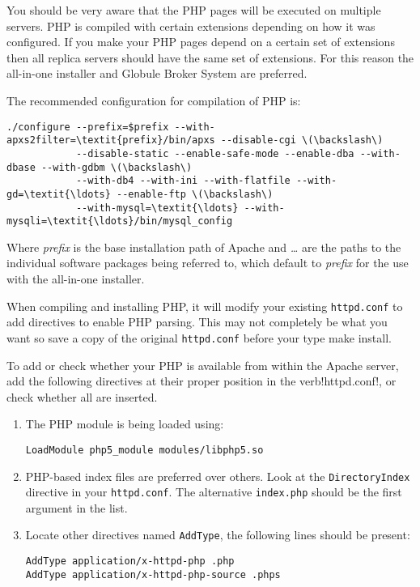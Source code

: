 \documentclass[10pt,a4paper]{article}
\makeatletter
\newenvironment{p}{\@open{P}{}}{\@close{P}}
\newenvironment{p}{}{\par}
\makeatother
\begin{document}
\begin{p}
You should be very aware that the PHP pages will be executed on multiple
servers.
PHP is compiled with certain extensions depending on how it was configured.
If you make your PHP pages depend on a certain set of extensions then all
replica servers should have the same set of extensions.  For this reason the
all-in-one installer and Globule Broker System are preferred.
\end{p}

\begin{p}
The recommended configuration for compilation of PHP is:
\end{p}
\begin{Verbatim}
./configure --prefix=$prefix --with-apxs2filter=\textit{prefix}/bin/apxs --disable-cgi \(\backslash\)
            --disable-static --enable-safe-mode --enable-dba --with-dbase --with-gdbm \(\backslash\)
            --with-db4 --with-ini --with-flatfile --with-gd=\textit{\ldots} --enable-ftp \(\backslash\)
            --with-mysql=\textit{\ldots} --with-mysqli=\textit{\ldots}/bin/mysql_config 
\end{Verbatim}

\begin{p}
Where \textit{prefix} is the base installation path of Apache and
\textit{\ldots} are the paths to the individual software packages being
referred to, which default to \textit{prefix} for the use with the all-in-one
installer.
\end{p}

\begin{p}
When compiling and installing PHP, it will modify your existing
\verb!httpd.conf! to add directives to enable PHP parsing.  This may not
completely be what you want so save a copy of the original \verb!httpd.conf!
before your type make install.
\end{p}

\begin{p}
To add or check whether your PHP is available from within the Apache server,
add the following directives at their proper position in the verb!httpd.conf!,
or check whether all are inserted.
\end{p}

\begin{p}
\begin{enumerate}
\item The PHP module is being loaded using:
\begin{Verbatim}
LoadModule php5_module modules/libphp5.so
\end{Verbatim}
\item PHP-based index files are preferred over others.  Look at the
      \verb!DirectoryIndex! directive in your \verb!httpd.conf!.
      The alternative \verb!index.php! should be the first argument in the
      list.
\item Locate other directives named \verb!AddType!, the following lines should
      be present:
\begin{Verbatim}
AddType application/x-httpd-php .php
AddType application/x-httpd-php-source .phps
\end{Verbatim}
\end{enumerate}
\end{p}
\end{document}
